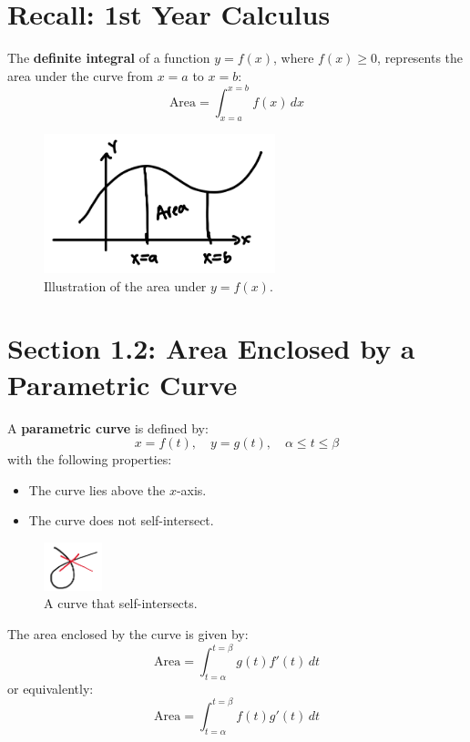 \documentclass{article}
\begin{document}

\normalsize

\section*{Recall: 1st Year Calculus}
\begin{definitionbox}
The \textbf{definite integral} of a function \( y = f(x) \), where \( f(x) \geq 0 \), represents the area under the curve from \( x = a \) to \( x = b \):
\[
    \text{Area} = \int_{x=a}^{x=b} f(x) \, dx
\]
\begin{figure}[H]
    \centering
    \includegraphics[width=0.6\textwidth]{1styearcalc.jpg}
    \caption{Illustration of the area under \( y = f(x) \).}
    \label{fig:sample_image}
\end{figure}
\end{definitionbox}

\section*{Section 1.2: Area Enclosed by a Parametric Curve}
\begin{definitionbox}
A \textbf{parametric curve} is defined by:
\[
    x = f(t), \quad y = g(t), \quad \alpha \leq t \leq \beta
\]
with the following properties:
\begin{itemize}
    \item The curve lies above the \( x \)-axis.
    \item The curve does not self-intersect.
\end{itemize}
\begin{figure}[H]
    \centering
    \includegraphics[width=0.15\textwidth]{self_intersecting_parametric_curve_example.png}
    \caption{A curve that self-intersects.}
    \label{fig:sample_image}
\end{figure}

\begin{theorembox}
    The area enclosed by the curve is given by:
    \[
        \text{Area} = \int_{t=\alpha}^{t=\beta} g(t) f'(t) \, dt
    \]
    or equivalently:
    \[
        \text{Area} = \int_{t=\alpha}^{t=\beta} f(t) g'(t) \, dt
    \]
\end{theorembox}
\end{definitionbox}
\end{document}
